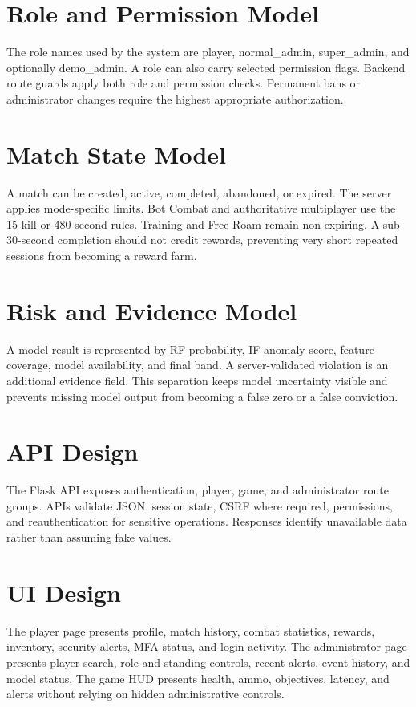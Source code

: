 \documentclass[12pt,a4paper,oneside]{report}
\begin{document}
\section{Role and Permission Model}
The role names used by the system are player, normal\_admin, super\_admin, and optionally demo\_admin. A role can also carry selected permission flags. Backend route guards apply both role and permission checks. Permanent bans or administrator changes require the highest appropriate authorization.

\section{Match State Model}
A match can be created, active, completed, abandoned, or expired. The server applies mode-specific limits. Bot Combat and authoritative multiplayer use the 15-kill or 480-second rules. Training and Free Roam remain non-expiring. A sub-30-second completion should not credit rewards, preventing very short repeated sessions from becoming a reward farm.

\section{Risk and Evidence Model}
A model result is represented by RF probability, IF anomaly score, feature coverage, model availability, and final band. A server-validated violation is an additional evidence field. This separation keeps model uncertainty visible and prevents missing model output from becoming a false zero or a false conviction.

\section{API Design}
The Flask API exposes authentication, player, game, and administrator route groups. APIs validate JSON, session state, CSRF where required, permissions, and reauthentication for sensitive operations. Responses identify unavailable data rather than assuming fake values.

\section{UI Design}
The player page presents profile, match history, combat statistics, rewards, inventory, security alerts, MFA status, and login activity. The administrator page presents player search, role and standing controls, recent alerts, event history, and model status. The game HUD presents health, ammo, objectives, latency, and alerts without relying on hidden administrative controls.
\end{document}
